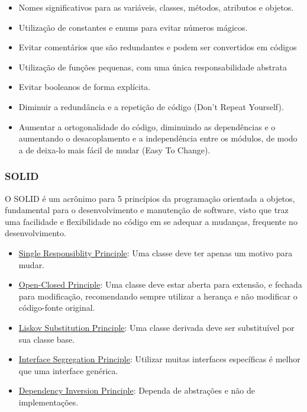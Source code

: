 \begin{itemize}
    \item Nomes significativos para as variáveis, classes, métodos, atributos e objetos.
    \item Utilização de constantes e enums para evitar números mágicos.
    \item Evitar comentários que são redundantes e podem ser convertidos em códigos
    \item Utilização de funções pequenas, com uma única responsabilidade abstrata
    \item Evitar booleanos de forma explícita.
    \item Diminuir a redundância e a repetição de código (Don't Repeat Yourself).
    \item Aumentar a ortogonalidade do código, diminuindo as dependências e o aumentando o desacoplamento e a independência entre os módulos, de modo a de deixa-lo mais fácil de mudar (Easy To Change).
\end{itemize}

\subsubsection{SOLID}

O SOLID é um acrônimo para 5 princípios da programação orientada a objetos, fundamental para o desenvolvimento e manutenção de software, visto que traz uma facilidade e flexibilidade no código em se adequar a mudanças, frequente no desenvolvimento.

\begin{itemize}
    \item \underline{Single Responsiblity Principle}: Uma classe deve ter apenas um motivo para mudar.
    \item \underline{Open-Closed Principle}: Uma classe deve estar aberta para extensão, e fechada para modificação, recomendando sempre utilizar a herança e não modificar o código-fonte original.
    \item \underline{Liskov Substitution Principle}: Uma classe derivada deve ser substituível por sua classe base.
    \item \underline{Interface Segregation Principle}: Utilizar muitas interfaces específicas é melhor que uma interface genérica.
    \item \underline{Dependency Inversion Principle}: Dependa de abstrações e não de implementações.
\end{itemize}

